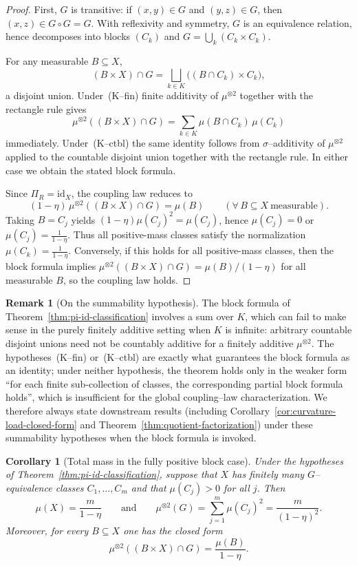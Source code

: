 \documentclass[11pt]{article}
\numberwithin{equation}{section}
\newtheorem{corollary}[theorem]{Corollary}
\theoremstyle{definition}
\newtheorem{remark}[theorem]{Remark}
\begin{document}
\begin{proof}
First, $G$ is transitive: if $(x,y)\in G$ and $(y,z)\in G$, then $(x,z)\in G\circ G=G$.
With reflexivity and symmetry, $G$ is an equivalence relation, hence decomposes into blocks $(C_k)$ and
$G=\bigcup_k (C_k\times C_k)$.

For any measurable $B\subseteq X$,
\[
(B\times X)\cap G=\bigsqcup_{k\in K}\big((B\cap C_k)\times C_k\big),
\]
a disjoint union. Under~(K--fin) finite additivity of $\mu^{\otimes2}$ together with the rectangle rule gives
\[
\mu^{\otimes2}((B\times X)\cap G)=\sum_{k\in K}\mu(B\cap C_k)\,\mu(C_k)
\]
immediately. Under~(K--ctbl) the same identity follows from $\sigma$--additivity of $\mu^{\otimes2}$ applied to the countable disjoint union together with the rectangle rule. In either case we obtain the stated block formula.

Since $\Pi_R=\mathrm{id}_X$, the coupling law reduces to
\[
(1-\eta)\,\mu^{\otimes2}((B\times X)\cap G)=\mu(B)\qquad(\forall\,B\subseteq X\ \text{measurable}).
\]
Taking $B=C_j$ yields $(1-\eta)\mu(C_j)^2=\mu(C_j)$, hence $\mu(C_j)=0$ or $\mu(C_j)=\frac{1}{1-\eta}$.
Thus all positive-mass classes satisfy the normalization $\mu(C_k)=\frac{1}{1-\eta}$.
Conversely, if this holds for all positive-mass classes, then the block formula implies
$\mu^{\otimes2}((B\times X)\cap G)=\mu(B)/(1-\eta)$ for all measurable $B$, so the coupling law holds.
\end{proof}

\begin{remark}[On the summability hypothesis]\label{rem:block-summability}
The block formula of Theorem~\ref{thm:pi-id-classification} involves a sum over $K$, which can fail to make sense in the purely finitely additive setting when $K$ is infinite: arbitrary countable disjoint unions need not be countably additive for a finitely additive $\mu^{\otimes2}$. The hypotheses~(K--fin) or~(K--ctbl) are exactly what guarantees the block formula as an identity; under neither hypothesis, the theorem holds only in the weaker form ``for each finite sub-collection of classes, the corresponding partial block formula holds'', which is insufficient for the global coupling--law characterization. We therefore always state downstream results (including Corollary~\ref{cor:curvature-load-closed-form} and Theorem~\ref{thm:quotient-factorization}) under these summability hypotheses when the block formula is invoked.
\end{remark}

\begin{corollary}[Total mass in the fully positive block case]\label{cor:pi-id-total-mass}
Under the hypotheses of Theorem~\ref{thm:pi-id-classification}, suppose that $X$ has finitely many
$G$--equivalence classes $C_1,\dots,C_m$ and that $\mu(C_j)>0$ for all $j$.
Then
\[
\mu(X)=\frac{m}{1-\eta}
\qquad\text{and}\qquad
\mu^{\otimes2}(G)=\sum_{j=1}^m \mu(C_j)^2=\frac{m}{(1-\eta)^2}.
\]
Moreover, for every $B\subseteq X$ one has the closed form
\[
\mu^{\otimes2}((B\times X)\cap G)=\frac{\mu(B)}{1-\eta}.
\]
\end{corollary}
\end{document}
